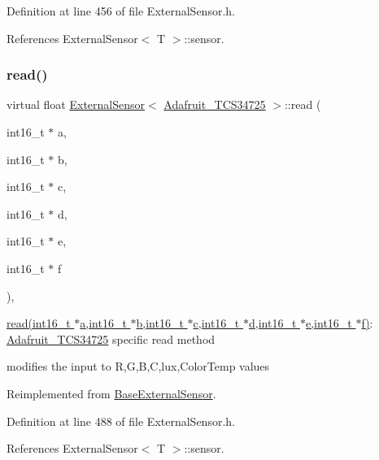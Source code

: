 Definition at line 456 of file External\+Sensor.\+h.



References External\+Sensor$<$ T $>$\+::sensor.

\mbox{\label{class_external_sensor_3_01_adafruit___t_c_s34725_01_4_a129ee155fe53aa069cb972bcf52e25f7}} 
\subsubsection{\texorpdfstring{read()}{read()}}
{\footnotesize\ttfamily virtual float \hyperlink{class_external_sensor}{External\+Sensor}$<$ \hyperlink{class_adafruit___t_c_s34725}{Adafruit\+\_\+\+T\+C\+S34725} $>$\+::read (\begin{DoxyParamCaption}\item[{int16\+\_\+t $\ast$}]{a,  }\item[{int16\+\_\+t $\ast$}]{b,  }\item[{int16\+\_\+t $\ast$}]{c,  }\item[{int16\+\_\+t $\ast$}]{d,  }\item[{int16\+\_\+t $\ast$}]{e,  }\item[{int16\+\_\+t $\ast$}]{f }\end{DoxyParamCaption})\hspace{0.3cm}{\ttfamily [inline]}, {\ttfamily [virtual]}}

\hyperlink{class_external_sensor_3_01_adafruit___t_c_s34725_01_4_a129ee155fe53aa069cb972bcf52e25f7}{read(int16\+\_\+t $\ast$a,int16\+\_\+t $\ast$b,int16\+\_\+t $\ast$c,int16\+\_\+t $\ast$d,int16\+\_\+t $\ast$e,int16\+\_\+t $\ast$f)}\+: \hyperlink{class_adafruit___t_c_s34725}{Adafruit\+\_\+\+T\+C\+S34725} specific read method

modifies the input to R,G,B,C,lux,Color\+Temp values 

Reimplemented from \hyperlink{class_base_external_sensor_a1867ba10561be26f2f5ec29421e6fb21}{Base\+External\+Sensor}.



Definition at line 488 of file External\+Sensor.\+h.



References External\+Sensor$<$ T $>$\+::sensor.



